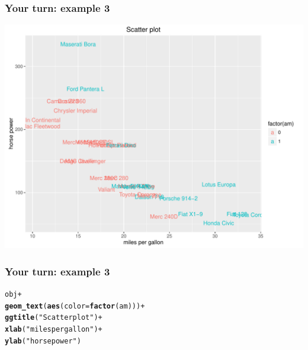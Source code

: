 \documentclass[12pt]{beamer}\usepackage[]{graphicx}\usepackage[]{color}
\makeatletter
\newcommand{\hlstr}[1]{\textcolor[rgb]{0.192,0.494,0.8}{#1}}%
\newcommand{\hlopt}[1]{\textcolor[rgb]{0,0,0}{#1}}%
\newcommand{\hlstd}[1]{\textcolor[rgb]{0.345,0.345,0.345}{#1}}%
\newcommand{\hlkwc}[1]{\textcolor[rgb]{0.333,0.667,0.333}{#1}}%
\newcommand{\hlkwd}[1]{\textcolor[rgb]{0.737,0.353,0.396}{\textbf{#1}}}%
\newenvironment{kframe}{%
 \def\at@end@of@kframe{}%
 \ifinner\ifhmode%
  \def\at@end@of@kframe{\end{minipage}}%
  \begin{minipage}{\columnwidth}%
 \fi\fi%
 \def\FrameCommand##1{\hskip\@totalleftmargin \hskip-\fboxsep
 \colorbox{shadecolor}{##1}\hskip-\fboxsep
     \hskip-\linewidth \hskip-\@totalleftmargin \hskip\columnwidth}%
 \MakeFramed {\advance\hsize-\width
   \@totalleftmargin\z@ \linewidth\hsize
   \@setminipage}}%
 {\par\unskip\endMakeFramed%
 \at@end@of@kframe}
\newenvironment{knitrout}{}{} %
\makeatother
\begin{document}

\begin{frame}[fragile]
\frametitle{Your turn: example 3}
\begin{knitrout}\scriptsize
{}\color{fgcolor}

{\centering \includegraphics[width=.8\linewidth,height=.6\linewidth]{figure/your_xyplot3-1} 

}



\end{knitrout}
\end{frame}


\begin{frame}[fragile]
\frametitle{Your turn: example 3}
\begin{knitrout}\footnotesize
{}\color{fgcolor}\begin{kframe}
\begin{alltt}
\hlstd{obj} \hlopt{+}
  \hlkwd{geom_text}\hlstd{(}\hlkwd{aes}\hlstd{(}\hlkwc{color} \hlstd{=} \hlkwd{factor}\hlstd{(am)))} \hlopt{+}
  \hlkwd{ggtitle}\hlstd{(}\hlstr{"Scatter plot"}\hlstd{)} \hlopt{+}
  \hlkwd{xlab}\hlstd{(}\hlstr{"miles per gallon"}\hlstd{)} \hlopt{+}
  \hlkwd{ylab}\hlstd{(}\hlstr{"horse power"}\hlstd{)}
\end{alltt}
\end{kframe}
\end{knitrout}
\end{frame}


\begin{frame}
\begin{center}
\Huge{}
\end{center}
\end{frame}
\end{document}
